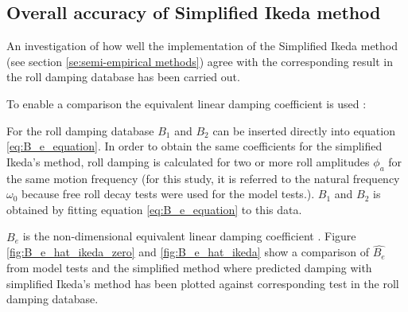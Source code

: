 \subsection{Overall accuracy of Simplified Ikeda method}
\label{se:overall_comparison}
An investigation of how well the implementation of the Simplified Ikeda method (see section \ref{se:semi-empirical methods}) agree with the corresponding result in the roll damping database has been carried out. 

To enable a comparison the equivalent linear damping coefficient is used \parencite{himeno_prediction_1981}:


For the roll damping database $B_1$ and $B_2$ can be inserted directly into equation  \ref{eq:B_e_equation}. 
In order to obtain the same coefficients for the simplified Ikeda's method, roll damping is calculated for two or more roll amplitudes $\phi_a$ for the same motion frequency (for this study, it is referred to the natural frequency $\omega_0$ because free roll decay tests were used for the model tests.). $B_1$ and $B_2$ is obtained by fitting equation \ref{eq:B_e_equation} to this data.  

$\hat{B_e}$ is the non-dimensional equivalent linear damping coefficient \parencite{himeno_prediction_1981}.
Figure \ref{fig:B_e_hat_ikeda_zero} and \ref{fig:B_e_hat_ikeda} show a comparison of $\hat{B_e}$ from model tests and the simplified method where predicted damping with simplified Ikeda's method has been plotted against corresponding test in the roll damping database.  

